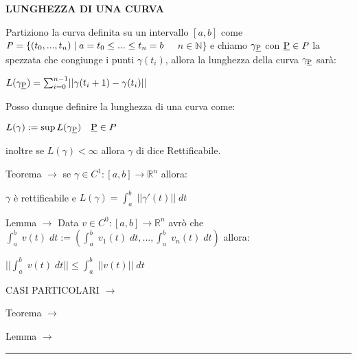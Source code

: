 \documentclass[8pt]{extarticle}
\newenvironment{formulario}
{
\setlength{\columnsep}{3em}
\twocolumn
\lstset{tabsize=3}
\begin{spacing}{1}
\begin{flushleft}
}{
\end{flushleft}
\end{spacing}
}
\newenvironment{tcenter}{
  \par
  \centering
  \setlength{\parskip}{0pt} %
  \noindent
}{
  \par
}
\newenvironment{Descr}
{
	\begin{description}[topsep=0pt,itemsep=0pt,partopsep=0pt, parsep=0pt]
}{
	\end{description}
}
\newenvironment{myParagraph}[1]
{
\begin{tcenter}
\textbf{#1}
\end{tcenter}
}{
\myRule
}
\newcommand{\norma}[1]{\lvert\lvert #1\rvert\rvert}
\newcommand{\R}{\mathbb{R}}
\newcommand{\N}{\mathbb{N}}
\newcommand{\myRule}{\rule{250pt}{0.1pt}}
\newcommand{\ra}{\rightarrow}
\begin{document}
\begin{formulario}
		\begin{myParagraph}{LUNGHEZZA DI UNA CURVA}
Partiziono la curva definita su un intervallo $[a,b]$ come $\text{\textit{P}}=\{(t_0,...,t_n) \;|\; a=t_0 \leq ... \leq t_n=b$ $\quad n\in\N\}$ e chiamo $\gamma_{\text{\underline{P}}}$ con $\text{\underline{P}} \in \text{\textit{P}}$ la spezzata che congiunge i punti $\gamma(t_i)$, allora la lunghezza della curva $\gamma_{\text{\underline{P}}}$ sarà:\\
			\begin{tcenter}
					$L(\gamma_{\text{\underline{P}}})=\sum_{i=0}^{n-1} \norma{\gamma(t_i+1)-\gamma(t_i)}$
			\end{tcenter}
				Posso dunque definire la lunghezza di una curva come:
			\begin{tcenter}
					$L(\gamma):=\sup L(\gamma_{\text{\underline{P}}})\quad\text{\underline{P}}\in P$
			\end{tcenter}
				inoltre se $L(\gamma)<\infty$ allora $\gamma$ di dice Rettificabile.
			\begin{Descr}
				\item[Teorema] $\ra$ se $\gamma\in C^1 :[a,b]\to\R^n$ allora:
				\begin{tcenter}
					$\gamma$ è rettificabile e $L(\gamma)=\int_a^b \; \norma{\gamma'(t)} \; dt$
				\end{tcenter}
				\item[Lemma] $\ra$ Data $v\in C^0:[a,b]\to\R^n$ avrò che $\int_a^b \; v(t)\; dt:=\left(\int_a^b \; v_1(t)\; dt,...,\int_a^b \; v_n(t)\; dt\right)$ allora:
				\begin{tcenter}
					$\norma{\int_a^b \; v(t)\; dt}\leq \int_a^b \; \norma{v(t)}\; dt$
				\end{tcenter}
				\item[CASI PARTICOLARI] $\ra$
				\begin{Descr}
					\item[Teorema] $\ra$
					\item[Lemma] $\ra$
				\end{Descr}
			\end{Descr}
 		\end{myParagraph}
		

	
	
	
	\end{formulario}
\end{document}
